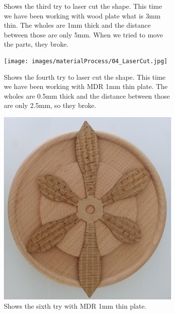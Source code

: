 \documentclass[04.3_buildingProcess.tex]{subfiles}
\begin{document}
\begin{figure}[H]
\begin{subfigure}{.45\textwidth}
            \caption{Shows the third try to laser cut the shape. This time we have been
                    working with wood plate what is 3mm thin. The wholes are 1mm thick 
                    and the distance between those are only 5mm. When we tried to move
                    the parts, they broke.}
            \label{fig:03_LaserCut}
            \vspace{6mm}
        \end{subfigure}
        \hspace{1mm}
        \begin{subfigure}{.45\textwidth}
            \centering
            \texttt{[image: images/materialProcess/04\_LaserCut.jpg]}
            \caption{Shows the fourth try to laser cut the shape. This time we have been
                    working with MDR 1mm thin plate. The wholes are 0.5mm thick and the 
                    distance between those are only 2.5mm, so they broke.}
            \label{fig:04_LaserCut}
            \vspace{6mm}
        \end{subfigure}
        \hspace{1mm}
        \begin{subfigure}{.45\textwidth}
            \centering
            \includegraphics[width=0.6\linewidth]{images/materialProcess/06_LaserCut.jpg}
            \caption{Shows the sixth try with MDR 1mm thin plate.}
            \label{fig:04_LaserCut}
            \vspace{6mm}
        \end{subfigure}
        \begin{subfigure}{.45\textwidth}
            \centering

\end{subfigure}
\end{figure}
\end{document}
